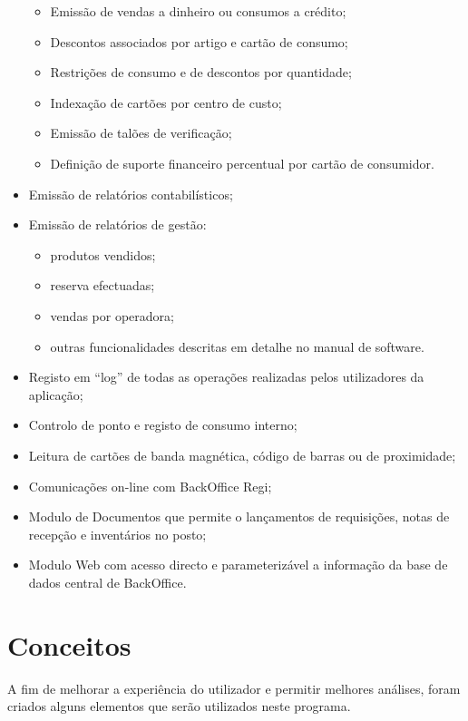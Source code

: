 \documentclass[a4paper,11pt,openany]{memoir}
\begin{document}
\begin{itemize}
\begin{itemize}
\item Emissão de vendas a dinheiro ou consumos a crédito;
\item Descontos associados por artigo e cartão de consumo;
\item Restrições de consumo e de descontos por quantidade;
\item Indexação de cartões por centro de custo;
\item Emissão de talões de verificação;
\item Definição de suporte financeiro percentual por cartão de consumidor.
\end{itemize}
\item Emissão de relatórios contabilísticos;
\item Emissão de relatórios de gestão:
\begin{itemize}
\item produtos vendidos;
\item reserva efectuadas;
\item vendas por operadora;
\item outras funcionalidades descritas em detalhe no manual de software.
\end{itemize}
\item Registo em “log” de todas as operações realizadas pelos utilizadores da aplicação;
\item Controlo de ponto e registo de consumo interno;
\item Leitura de cartões de banda magnética, código de barras ou de proximidade;
\item Comunicações on-line com BackOffice Regi;
\item Modulo de Documentos que permite o lançamentos de requisições, notas de recepção e inventários no posto;
\item Modulo Web com acesso directo e parameterizável a informação da base de dados central de BackOffice.

\end{itemize}






\section{Conceitos}

A fim de melhorar a experiência do utilizador e permitir melhores análises, foram criados alguns elementos 
que serão utilizados neste programa.
\end{document}
